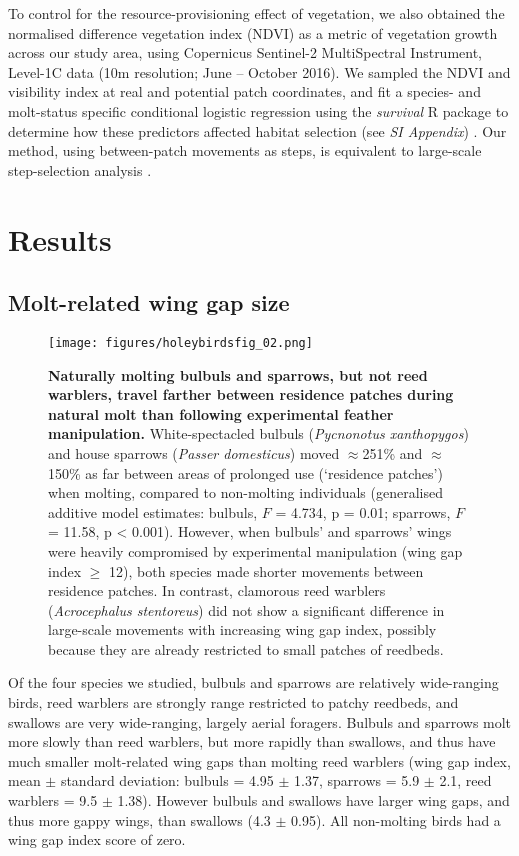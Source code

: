 \begin{refsection}
To control for the resource-provisioning effect of vegetation, we also obtained the normalised difference vegetation index (NDVI) as a metric of vegetation growth \citep{pettorelli2011} across our study area, using Copernicus Sentinel-2 MultiSpectral Instrument, Level-1C data (10m resolution; June -- October 2016).
We sampled the NDVI and visibility index at real and potential patch coordinates, and fit a species- and molt-status specific conditional logistic regression using the \textit{survival} R package to determine how these predictors affected habitat selection (see \textit{SI Appendix}) \cite{signer2019,fieberg2021}.
Our method, using between-patch movements as steps, is equivalent to large-scale step-selection analysis \citep{fieberg2021}.

\section*{Results}

\subsection*{Molt-related wing gap size}

\begin{figure}%
\centering
\texttt{[image: figures/holeybirdsfig\_02.png]}
\caption{
    \textbf{Naturally molting bulbuls and sparrows, but not reed warblers, travel farther between residence patches during natural molt than following experimental feather manipulation.}
    White-spectacled bulbuls (\textit{Pycnonotus xanthopygos}) and house sparrows (\textit{Passer domesticus}) moved $\approx$251\% and $\approx$150\% as far between areas of prolonged use (`residence patches') when molting, compared to non-molting individuals (generalised additive model estimates: bulbuls, $F$ = 4.734, p = 0.01; sparrows, $F$ = 11.58, p < 0.001).
    However, when bulbuls' and sparrows' wings were heavily compromised by experimental manipulation (wing gap index $\geq$ 12), both species made shorter movements between residence patches.
    In contrast, clamorous reed warblers (\textit{Acrocephalus stentoreus}) did not show a significant difference in large-scale movements with increasing wing gap index, possibly because they are already restricted to small patches of reedbeds.
}\label{fig_holey_01}
\end{figure}

Of the four species we studied, bulbuls and sparrows are relatively wide-ranging birds, reed warblers are strongly range restricted to patchy reedbeds, and swallows are very wide-ranging, largely aerial foragers.
Bulbuls and sparrows molt more slowly than reed warblers, but more rapidly than swallows, and thus have much smaller molt-related wing gaps than molting reed warblers {(wing gap index, mean $\pm$ standard deviation: bulbuls = 4.95 $\pm$ 1.37, sparrows = 5.9 $\pm$ 2.1, reed warblers = 9.5 $\pm$ 1.38)}.
However bulbuls and swallows have larger wing gaps, and thus more gappy wings, than swallows (4.3 $\pm$ 0.95).
All non-molting birds had a wing gap index score of zero.


\end{refsection}
